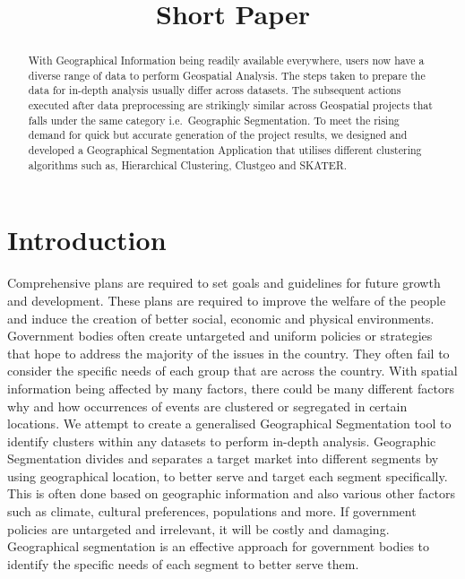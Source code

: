 \documentclass{acm_proc_article-sp}
\title{Short Paper}
\author{
\alignauthor Darryl Kwok \\
        \affaddr{Singapore Management University}\\
       \email{}
\and \alignauthor Megan Sim \\
        \affaddr{Singapore Management University}\\
       \email{}
\and \alignauthor Xu Pengtai \\
        \affaddr{National University of Singapore}\\
       \email{}
\and }
\date{}
\begin{document}
\maketitle

\begin{abstract}
With Geographical Information being readily available everywhere, users
now have a diverse range of data to perform Geospatial Analysis. The
steps taken to prepare the data for in-depth analysis usually differ
across datasets. The subsequent actions executed after data
preprocessing are strikingly similar across Geospatial projects that
falls under the same category i.e.~Geographic Segmentation. To meet the
rising demand for quick but accurate generation of the project results,
we designed and developed a Geographical Segmentation Application that
utilises different clustering algorithms such as, Hierarchical
Clustering, Clustgeo and SKATER.
\end{abstract}

\hypertarget{introduction}{%
\section{Introduction}\label{introduction}}

Comprehensive plans are required to set goals and guidelines for future
growth and development. These plans are required to improve the welfare
of the people and induce the creation of better social, economic and
physical environments. Government bodies often create untargeted and
uniform policies or strategies that hope to address the majority of the
issues in the country. They often fail to consider the specific needs of
each group that are across the country. With spatial information being
affected by many factors, there could be many different factors why and
how occurrences of events are clustered or segregated in certain
locations. We attempt to create a generalised Geographical Segmentation
tool to identify clusters within any datasets to perform in-depth
analysis. Geographic Segmentation divides and separates a target market
into different segments by using geographical location, to better serve
and target each segment specifically. This is often done based on
geographic information and also various other factors such as climate,
cultural preferences, populations and more. If government policies are
untargeted and irrelevant, it will be costly and damaging. Geographical
segmentation is an effective approach for government bodies to identify
the specific needs of each segment to better serve them.
\end{document}
